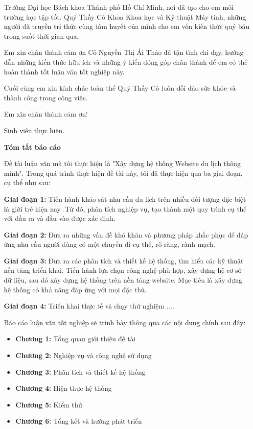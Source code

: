 \documentclass[12pt,a4paper]{report}
\begin{document}
Trường Đại học Bách khoa Thành phố Hồ Chí Minh, nơi đã tạo cho em môi trường học tập tốt. Quý Thầy Cô Khoa Khoa học và Kỹ thuật Máy tính, những người đã truyền tri thức cùng tâm huyết của mình cho em vốn kiến thức quý báu trong suốt thời gian qua.

Em xin chân thành cảm ơn Cô Nguyễn Thị Ái Thảo đã tận tình chỉ dạy, hướng dẫn những kiến thức hữu ích và những ý kiến đóng góp chân thành để em có thể hoàn thành tốt luận văn tốt nghiệp này.

Cuối cùng em xin kính chúc toàn thể Quý Thầy Cô luôn dồi dào sức khỏe và thành công trong công việc.

Em xin chân thành cảm ơn!


\begin{flushright}
Sinh viên thực hiện.
\end{flushright}

\newpage
\begin{center}
\textbf{\LARGE Tóm tắt báo cáo}
\end{center}

    Đề tài luận văn mà tôi thực hiện là "Xây dựng hệ thống Website du lịch thông minh". Trong quá trình thực hiện đề tài này, tôi đã thực hiện qua ba giai đoạn, cụ thể như sau:

\textbf{Giai đoạn 1: } Tiến hành khảo sát nhu cầu du lịch trên nhiều đối tượng đặc biệt là giới trẻ hiện nay .Từ đó, phân tích nghiệp vụ, tạo thành một quy trình cụ thể với đầu ra và đầu vào được xác định.

\textbf{Giai đoạn 2: } Đưa ra những vấn đề khó khăn và phương pháp khắc phục để đáp ứng nhu cầu người dùng  có một chuyến đi cụ thể, rõ ràng, rành mạch.

\textbf{Giai đoạn 3: } Đưa ra các phân tích và thiết kế hệ thống, tìm hiểu các kỹ thuật nền tảng triển khai. Tiến hành lựa chọn công nghệ phù hợp, xây dựng hệ cơ sở dữ liệu, sau đó xây dựng hệ thống trên nền tảng website. Mục tiêu là xây dựng hệ thống có khả năng đáp ứng với mọi đặc thù.

\textbf{Giai đoạn 4: } Triển khai thực tế và chạy thử nghiệm ....

    Báo cáo luận văn tốt nghiệp sẽ trình bày thông qua các nội dung chính sau đây:
    \begin{itemize}
        \item \textbf{Chương 1:} Tổng quan giới thiệu đề tài
        \item \textbf{Chương 2:} Nghiệp vụ và công nghệ sử dụng
        \item \textbf{Chương 3:} Phân tích và thiết kế hệ thống
        \item \textbf{Chương 4:} Hiện thực hệ thống
        \item \textbf{Chương 5:} Kiểm thử 
        \item \textbf{Chương 6:} Tổng kết và hướng phát triển
    \end{itemize}
\end{document}

